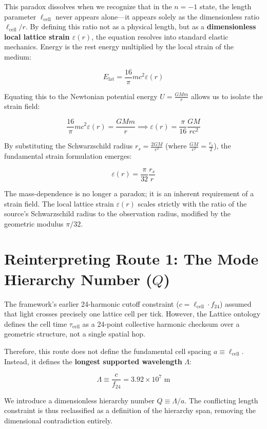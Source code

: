 \documentclass[11pt, letterpaper, openany]{book}
\begin{document}
This paradox dissolves when we recognize that in the $n=-1$ state, the length parameter $\ell_{\text{cell}}$ never appears alone—it appears solely as the dimensionless ratio $\ell_{\text{cell}}/r$. By defining this ratio not as a physical length, but as a \textbf{dimensionless local lattice strain $\varepsilon(r)$}, the equation resolves into standard elastic mechanics. Energy is the rest energy multiplied by the local strain of the medium:

\[
E_{\text{lat}} = \frac{16}{\pi} m c^2 \varepsilon(r)
\]

Equating this to the Newtonian potential energy $U = \frac{GMm}{r}$ allows us to isolate the strain field:

\[
\frac{16}{\pi} m c^2 \varepsilon(r) = \frac{GMm}{r} \implies \varepsilon(r) = \frac{\pi}{16} \frac{GM}{r c^2}
\]

By substituting the Schwarzschild radius $r_s = \frac{2GM}{c^2}$ (where $\frac{GM}{c^2} = \frac{r_s}{2}$), the fundamental strain formulation emerges:

\[
\varepsilon(r) = \frac{\pi}{32} \frac{r_s}{r}
\]

The mass-dependence is no longer a paradox; it is an inherent requirement of a strain field. The local lattice strain $\varepsilon(r)$ scales strictly with the ratio of the source's Schwarzschild radius to the observation radius, modified by the geometric modulus $\pi/32$.

\section{Reinterpreting Route 1: The Mode Hierarchy Number ($Q$)}

The framework's earlier 24-harmonic cutoff constraint ($c = \ell_{\text{cell}} \cdot f_{24}$) assumed that light crosses precisely one lattice cell per tick. However, the Lattice ontology defines the cell time $\tau_{\text{cell}}$ as a 24-point collective harmonic checksum over a geometric structure, not a single spatial hop. 

Therefore, this route does not define the fundamental cell spacing $a \equiv \ell_{\text{cell}}$. Instead, it defines the \textbf{longest supported wavelength} $\Lambda$:

\[
\Lambda \equiv \frac{c}{f_{24}} = 3.92 \times 10^7 \text{ m}
\]

We introduce a dimensionless hierarchy number $Q \equiv \Lambda / a$. The conflicting length constraint is thus reclassified as a definition of the hierarchy span, removing the dimensional contradiction entirely.
\end{document}

